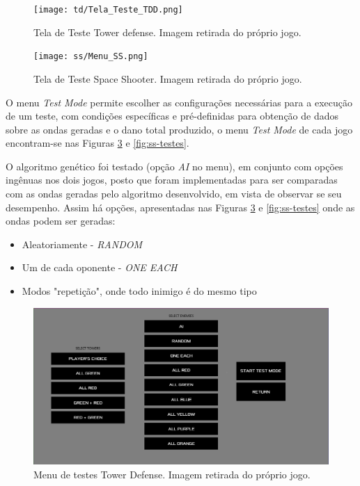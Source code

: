 \pagebreak

\begin{figure}
  \centering
  \texttt{[image: td/Tela\_Teste\_TDD.png]}
  \caption{Tela de Teste Tower defense. Imagem retirada do próprio jogo.\label{fig:tela-de-teste-tower defense}}
\end{figure}

\begin{figure}
  \centering
  \texttt{[image: ss/Menu\_SS.png]}
  \caption{Tela de Teste Space Shooter. Imagem retirada do próprio jogo.\label{fig:tela-de-teste-space-shooter}}
\end{figure}


O menu \textit{Test Mode} permite escolher as configurações necessárias para a execução de um teste, com condições específicas e pré-definidas para obtenção de dados sobre as ondas geradas e o dano total produzido, o menu \textit{Test Mode} de cada jogo encontram-se nas Figuras \ref{fig:td-testes} e  \ref{fig:ss-testes}.

O algoritmo genético foi testado (opção \textit{AI} no menu), em conjunto com opções ingênuas nos dois jogos, posto que foram implementadas para ser comparadas com as ondas geradas pelo algoritmo desenvolvido, em vista de observar se seu desempenho. Assim há opções, apresentadas nas Figuras \ref{fig:td-testes} e \ref{fig:ss-testes} onde as ondas podem ser geradas:
\begin{itemize}
  \item Aleatoriamente - \textit{RANDOM}
  \item Um de cada oponente - \textit{ONE EACH}
  \item Modos "repetição", onde todo inimigo é do mesmo tipo
\end{itemize}

\begin{figure}
  \centering
  \includegraphics[width=.8\textwidth]{figuras/td/Menu_Escolhas_TESTE_TDD.PNG}
  \caption{Menu de testes Tower Defense. Imagem retirada do próprio jogo.\label{fig:td-testes}}
\end{figure}


